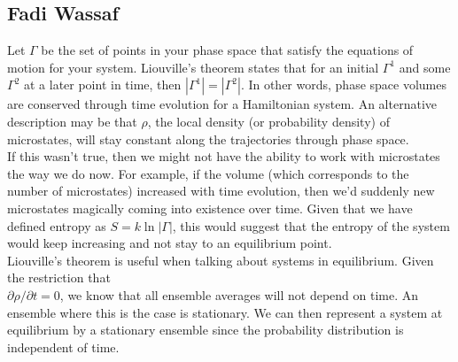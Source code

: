 \subsection{Fadi Wassaf}

\noindent Let $\Gamma$ be the set of points in your phase space that satisfy the equations of motion for your system. Liouville's theorem states that for an initial $\Gamma^1$ and some $\Gamma^2$ at a later point in time, then $|\Gamma^1| = |\Gamma^2|$. In other words, phase space volumes are conserved through time evolution for a Hamiltonian system. An alternative description may be that $\rho$, the local density (or probability density) of microstates, will stay constant along the trajectories through phase space.\\

\noindent If this wasn't true, then we might not have the ability to work with microstates the way we do now. For example, if the volume (which corresponds to the number of microstates) increased with time evolution, then we'd suddenly new microstates magically coming into existence over time. Given that we have defined entropy as $S=k\ln |\Gamma|$, this would suggest that the entropy of the system would keep increasing and not stay to an equilibrium point.\\

\noindent Liouville's theorem is useful when talking about systems in equilibrium. Given the restriction that\\ $\partial \rho / \partial t = 0$, we know that all ensemble averages will not depend on time. An ensemble where this is the case is stationary. We can then represent a system at equilibrium by a stationary ensemble since the probability distribution is independent of time.